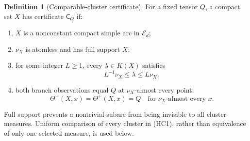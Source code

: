\documentclass[11pt]{article}
\theoremstyle{definition}\newtheorem{definition}[theorem]{Definition}
\theoremstyle{remark}\newtheorem{remark}[theorem]{Remark}
\begin{document}
\begin{definition}[Comparable-cluster certificate]
\label{def:comparable-cluster-certificate}
For a fixed tensor $Q$, a compact set $X$ has certificate $\mathsf C_Q$
if:
\begin{enumerate}
\item $X$ is a nonconstant compact simple arc in $\mathcal E_d$;
\item $\nu_X$ is atomless and has full support $X$;
\item for some integer $L\ge1$, every $\lambda\in K(X)$ satisfies
 \[
  L^{-1}\nu_X\le\lambda\le L\nu_X;
  \tag{HC1}
 \]
\item both branch observations equal $Q$ at $\nu_X$-almost every point:
 \[
   \Theta^-(X,x)=\Theta^+(X,x)=Q
          \quad\text{for }\nu_X\text{-almost every }x.
   \tag{HC2}
 \]
\end{enumerate}
\end{definition}

Full support prevents a nontrivial subarc from being invisible to all
cluster measures. Uniform comparison of every cluster in (HC1), rather
than equivalence of only one selected measure, is used below.
\end{document}
